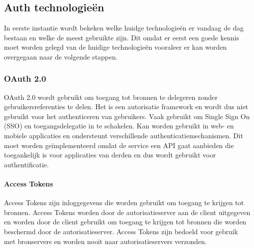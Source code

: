 \chapter{}%
\label{ch:stand-van-zaken}


\
\section{Auth technologieën}%
\label{sec:auth-technologieën}
In eerste instantie wordt bekeken welke huidge technologieën er vandaag de dag bestaan en welke de meest gebruikte zijn. Dit omdat er eerst een goede kennis
moet worden gelegd van de huidige technologieën vooraleer er kan worden overgegaan naar de volgende stappen.


\subsection{OAuth 2.0}%
\label{subsec:oauth-2.0}
\autocite{Hardt2012}
OAuth 2.0 wordt gebruikt om toegang tot bronnen te delegeren zonder gebruikersreferenties te delen. Het is een autorisatie framework en wordt dus niet gebruikt voor het authenticeren van gebruikers. Vaak gebruikt om Single Sign On (SSO) en toegangsdelegatie in te schakelen. Kan worden gebruikt in web- en mobiele applicaties en ondersteunt verschillende authenticatiemechanismen.
Dit moet worden geïmplementeerd omdat de service een API gaat aanbieden die toegankelijk is voor applicaties van derden en dus wordt gebruikt voor authentificatie.

\subsubsection{Access Tokens}%
\label{subsubsec:access-tokens}
Access Tokens zijn inloggegevens die worden gebruikt om toegang te krijgen tot bronnen. Access Tokens worden door de autorisatieserver aan de client uitgegeven en worden door de client gebruikt om toegang te krijgen tot bronnen die worden beschermd door de autorisatieserver. Access Tokens zijn bedoeld voor gebruik met bronservers en worden nooit naar autorisatieservers verzonden.

